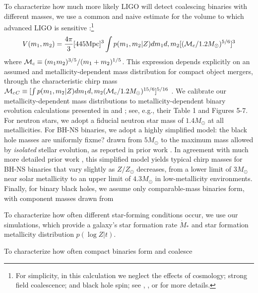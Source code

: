 \documentclass[nofootinbib,twocolumn,prd]{emulateapj}
\newcommand\mc{{\cal M}_c{}}
\newcommand\editremark[1]{{\color{red}#1}}
\newcommand\unit[1]{\text{#1}}
\begin{document}
\begin{widetext}
To characterize how much more likely LIGO will detect coalescing binaries with different masses, we use a common and
naive estimate for the volume to which advanced LIGO is sensitive \citep[see,e.g.,][]{PSellipticals}:\footnote{For
  simplicity, in this calculation we neglect the effects of cosmology; strong field coalescence; and black hole spin;
  see \cite{popsyn-LowMetallicityImpact2c-StarTrackRevised-2014}, \cite{AstroPaper}, or \cite{RatesPaper} for more details.}
\begin{eqnarray}
V(m_1,m_2) = \frac{4\pi}{3} [445 \unit{Mpc}]^3 \int p(m_1,m_2|Z) dm_1 d,m_2 [ (\mc/1.2 M_\odot)^{5/6}]^3
\end{eqnarray}
where $\mc\equiv (m_1 m_2)^{3/5}/(m_1+m_2)^{1/5}$.   
This expression depends explicitly on an assumed and metallicity-dependent mass distribution for compact object
mergers, through the characteristic chirp mass $\mc_{C}\equiv [\int p(m_1,m_2|Z) dm_1 d,m_2 (\mc/1.2
  M_\odot)^{15/6}]^{5/16}$ .  We calibrate our metallicity-dependent mass distributions to metallicity-dependent binary
evolution calculations presented in \cite{popsyn-LowMetallicityImpact2-StarTrackRevised-2012} and
\cite{popsyn-LowMetallicityImpact2c-StarTrackRevised-2014}; see, e.g., their Table 1 and Figures 5-7.    For neutron
stars, we adopt a fiducial neutron star mass of $1.4 M_\odot$ at all metallicities.  For BH-NS binaries, we adopt a
highly simplified model: the black hole masses are uniformly \editremark{fixme?} drawn from $5 M_\odot$ to the maximum mass allowed by
\emph{isolated} stellar evolution, as reported in prior work \citep[see,e.g.][and references
  therein]{gwastro-EventPopsynPaper-2016}.  In agreement with much more detailed prior work \cite{popsyn-LowMetallicityImpact2c-StarTrackRevised-2014}, this simplified model yields typical chirp masses for BH-NS binaries that
vary slightly as $Z/Z_\odot$ decreases, from a lower limit of $3 M_\odot$ near solar metallicity to an upper limit of
$4.3 M_\odot$ in low-metallicity environments.  Finally, for binary black holes, we assume only comparable-mass binaries
form, with  component masses drawn from 


To characterize how often different star-forming conditions occur, we use our simulations, which provide a galaxy's star formation rate
$\dot{M}_*$ and star formation metallicity distribution $p(\log Z|t)$.

To characterize how often compact binaries form and coalesce


\end{widetext}
\end{document}
